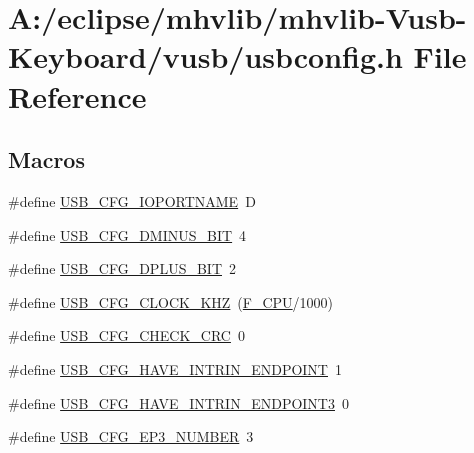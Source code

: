 \hypertarget{mhvlib-_vusb-_keyboard_2vusb_2usbconfig_8h}{\section{A\-:/eclipse/mhvlib/mhvlib-\/\-Vusb-\/\-Keyboard/vusb/usbconfig.h File Reference}
\label{mhvlib-_vusb-_keyboard_2vusb_2usbconfig_8h}
}
\subsection*{Macros}
\begin{DoxyCompactItemize}
\item 
\#define \hyperlink{mhvlib-_vusb-_keyboard_2vusb_2usbconfig_8h_a98ed17962b55543b35e10ae1f8ebe09b}{U\-S\-B\-\_\-\-C\-F\-G\-\_\-\-I\-O\-P\-O\-R\-T\-N\-A\-M\-E}~D
\item 
\#define \hyperlink{mhvlib-_vusb-_keyboard_2vusb_2usbconfig_8h_a3a8bf6679cd70d1ddcc05024ffef9922}{U\-S\-B\-\_\-\-C\-F\-G\-\_\-\-D\-M\-I\-N\-U\-S\-\_\-\-B\-I\-T}~4
\item 
\#define \hyperlink{mhvlib-_vusb-_keyboard_2vusb_2usbconfig_8h_a3005cdbb03c707af8007363632d7d02d}{U\-S\-B\-\_\-\-C\-F\-G\-\_\-\-D\-P\-L\-U\-S\-\_\-\-B\-I\-T}~2
\item 
\#define \hyperlink{mhvlib-_vusb-_keyboard_2vusb_2usbconfig_8h_a9bf12dabd0e5186299ed0f13cd00dfeb}{U\-S\-B\-\_\-\-C\-F\-G\-\_\-\-C\-L\-O\-C\-K\-\_\-\-K\-H\-Z}~(\hyperlink{mhvlib-_vusb-_console_2vusb_2oddebug_8h_a43bafb28b29491ec7f871319b5a3b2f8}{F\-\_\-\-C\-P\-U}/1000)
\item 
\#define \hyperlink{mhvlib-_vusb-_keyboard_2vusb_2usbconfig_8h_a57122aa75d9b598adcd238aee5f2b4b7}{U\-S\-B\-\_\-\-C\-F\-G\-\_\-\-C\-H\-E\-C\-K\-\_\-\-C\-R\-C}~0
\item 
\#define \hyperlink{mhvlib-_vusb-_keyboard_2vusb_2usbconfig_8h_afe176bba6f05a034a5eec11f7ed6302b}{U\-S\-B\-\_\-\-C\-F\-G\-\_\-\-H\-A\-V\-E\-\_\-\-I\-N\-T\-R\-I\-N\-\_\-\-E\-N\-D\-P\-O\-I\-N\-T}~1
\item 
\#define \hyperlink{mhvlib-_vusb-_keyboard_2vusb_2usbconfig_8h_a973c0b60531876ba52c4447e0fd0a150}{U\-S\-B\-\_\-\-C\-F\-G\-\_\-\-H\-A\-V\-E\-\_\-\-I\-N\-T\-R\-I\-N\-\_\-\-E\-N\-D\-P\-O\-I\-N\-T3}~0
\item 
\#define \hyperlink{mhvlib-_vusb-_keyboard_2vusb_2usbconfig_8h_a6ba1def233ee0e102febe80e53af53a7}{U\-S\-B\-\_\-\-C\-F\-G\-\_\-\-E\-P3\-\_\-\-N\-U\-M\-B\-E\-R}~3
\item 

\end{DoxyCompactItemize}
